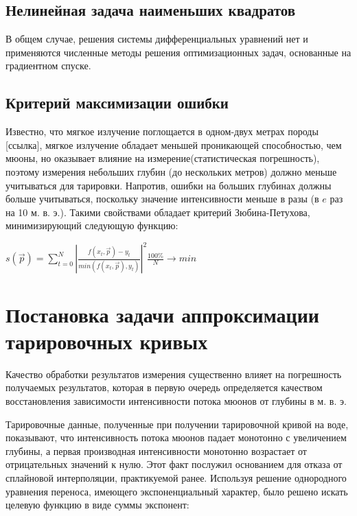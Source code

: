 \subsection{Нелинейная задача наименьших квадратов}


В общем случае, решения системы дифференциальных уравнений нет и 
применяются численные методы решения оптимизационных задач, 
основанные на градиентном спуске.

\subsection{Критерий максимизации ошибки}
Известно, что  мягкое излучение поглощается в одном-двух метрах породы [ссылка], мягкое излучение обладает
меньшей проникающей способностью, чем мюоны, но оказывает влияние на измерение(статистическая погрешность),
поэтому измерения небольших глубин (до нескольких метров) должно меньше учитываться для тарировки. 
Напротив, ошибки на больших глубинах должны больше учитываться, поскольку значение интенсивности  меньше в разы
(в $e$ раз на 10 м. в. э.). Такими свойствами обладает критерий Зюбина-Петухова, минимизирующий следующую функцию: 
\begin{center}
$s(\vec{p}) = \displaystyle\sum_{t=0}^N \left|
\frac{f(x_t, \vec{p}) - y_t}{min(f(x_t, \vec{p}), y_t)}\right|^2 
\frac{100\%}{N} \rightarrow min$ %
 
\end{center}


\section{Постановка задачи аппроксимации тарировочных кривых}\label{sect2_2}

Качество обработки результатов измерения существенно влияет на погрешность
получаемых результатов, которая в первую очередь определяется
качеством восстановления зависимости интенсивности потока мюонов от глубины в м. в. э.

Тарировочные данные, полученные при получении тарировочной кривой на воде, 
показывают, что интенсивность потока мюонов падает монотонно с увеличением
глубины, а первая производная интенсивности монотонно возрастает 
от отрицательных значений к нулю. Этот факт послужил основанием для отказа 
от сплайновой интерполяции, практикуемой ранее. Используя решение 
однородного уравнения переноса, имеющего экспоненциальный характер, было решено
искать целевую функцию в виде суммы экспонент:

